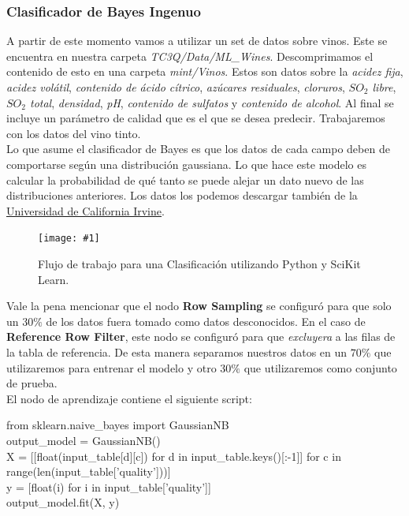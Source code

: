 \documentclass[10pt,letterpaper]{article}
\newenvironment{Code}
{
\begin{lrbox}{\selvestebox}%
\begin{minipage}{\dimexpr\columnwidth-2\fboxsep\relax}
\fontfamily{\ttdefault}\selectfont
}
{\end{minipage}\end{lrbox}%
\begin{center}
\colorbox{light-gray}{\usebox{\selvestebox}}
\end{center}
}
\newcommand{\Picture}[3]
{
	\begin{figure}[H]
	\begin{center}
	\caption{#3}
	\texttt{[image: \#1]}
	\end{center}
	\end{figure}
}
\begin{document}
\subsubsection{Clasificador de Bayes Ingenuo}
A partir de este momento vamos a utilizar un set de datos sobre vinos. Este se encuentra en nuestra carpeta \textit{TC3Q/Data/ML\_Wines}. Descomprimamos el contenido de esto en una carpeta \textit{mint/Vinos}. Estos son datos sobre la \textit{acidez fija}, \textit{acidez vol\'atil}, \textit{contenido de \'acido c\'itrico}, \textit{az\'ucares residuales}, \textit{cloruros}, \textit{$SO_2$ libre}, \textit{$SO_2$ total}, \textit{densidad}, \textit{pH}, \textit{contenido de sulfatos} y \textit{contenido de alcohol}. Al final se incluye un par\'ametro de calidad que es el que se desea predecir. Trabajaremos con los datos del vino tinto.\\

Lo que asume el clasificador de Bayes es que los datos de cada campo deben de comportarse seg\'un una distribuci\'on gaussiana. Lo que hace este modelo es calcular la probabilidad de qu\'e tanto se puede alejar un dato nuevo de las distribuciones anteriores. Los datos los podemos descargar tambi\'en de la \href{https://archive.ics.uci.edu/ml/datasets/wine+quality}{Universidad de California Irvine}.

\Picture{img/naive_bayes.png}{0.55}{Flujo de trabajo para una Clasificaci\'on utilizando Python y SciKit Learn.}
Vale la pena mencionar que el nodo \textbf{Row Sampling} se configur\'o para que solo un $30\%$ de los datos fuera tomado como datos desconocidos. En el caso de \textbf{Reference Row Filter}, este nodo se configur\'o para que \emph{excluyera} a las filas de la tabla de referencia. De esta manera separamos nuestros datos en un $70\%$ que utilizaremos para entrenar el modelo y otro $30\%$ que utilizaremos como conjunto de prueba.\\

\noindent El nodo de aprendizaje contiene el siguiente script:

\begin{Code}
from sklearn.naive\_bayes import GaussianNB\\

output\_model = GaussianNB()\\

X = [[float(input\_table[d][c]) for d in input\_table.keys()[:-1]] for c in range(len(input\_table['quality']))]\\
y = [float(i) for i in input\_table['quality']]\\

output\_model.fit(X, y)
\end{Code}
\end{document}
